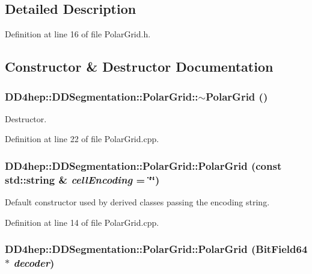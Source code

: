 \subsection{Detailed Description}


Definition at line 16 of file PolarGrid.h.

\subsection{Constructor \& Destructor Documentation}
\hypertarget{class_d_d4hep_1_1_d_d_segmentation_1_1_polar_grid_a894846ac7aeb9478a22e7bb0687178d8}{
\subsubsection[{$\sim$PolarGrid}]{\setlength{\rightskip}{0pt plus 5cm}DD4hep::DDSegmentation::PolarGrid::$\sim$PolarGrid ()}}
\label{class_d_d4hep_1_1_d_d_segmentation_1_1_polar_grid_a894846ac7aeb9478a22e7bb0687178d8}


Destructor. 

Definition at line 22 of file PolarGrid.cpp.\hypertarget{class_d_d4hep_1_1_d_d_segmentation_1_1_polar_grid_ac8fe161b5a7730ac7bf6f3a3a45f70a6}{
\subsubsection[{PolarGrid}]{\setlength{\rightskip}{0pt plus 5cm}DD4hep::DDSegmentation::PolarGrid::PolarGrid (const std::string \& {\em cellEncoding} = {\ttfamily \char`\"{}\char`\"{}})}}
\label{class_d_d4hep_1_1_d_d_segmentation_1_1_polar_grid_ac8fe161b5a7730ac7bf6f3a3a45f70a6}


Default constructor used by derived classes passing the encoding string. 

Definition at line 14 of file PolarGrid.cpp.\hypertarget{class_d_d4hep_1_1_d_d_segmentation_1_1_polar_grid_a292c46648971f17f21fa556425d1fd66}{
\subsubsection[{PolarGrid}]{\setlength{\rightskip}{0pt plus 5cm}DD4hep::DDSegmentation::PolarGrid::PolarGrid ({\bf BitField64} $\ast$ {\em decoder})}}
\label{class_d_d4hep_1_1_d_d_segmentation_1_1_polar_grid_a292c46648971f17f21fa556425d1fd66}


